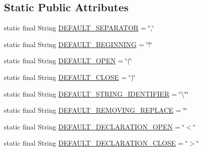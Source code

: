 \subsection*{Static Public Attributes}
\begin{DoxyCompactItemize}
\item 
static final String \hyperlink{classit_1_1emarolab_1_1cagg_1_1core_1_1language_1_1parser_1_1TextualParser_afd804f787ce5a65aec1bddbe5f258f74}{D\-E\-F\-A\-U\-L\-T\-\_\-\-S\-E\-P\-A\-R\-A\-T\-O\-R} = \char`\"{},\char`\"{}
\item 
static final String \hyperlink{classit_1_1emarolab_1_1cagg_1_1core_1_1language_1_1parser_1_1TextualParser_a82e3fa38ac4cf494023ae11e239b18e6}{D\-E\-F\-A\-U\-L\-T\-\_\-\-B\-E\-G\-I\-N\-N\-I\-N\-G} = \char`\"{}!\char`\"{}
\item 
static final String \hyperlink{classit_1_1emarolab_1_1cagg_1_1core_1_1language_1_1parser_1_1TextualParser_a4b3f1d558ca20b275641ed2a5e6b21eb}{D\-E\-F\-A\-U\-L\-T\-\_\-\-O\-P\-E\-N} = \char`\"{}(\char`\"{}
\item 
static final String \hyperlink{classit_1_1emarolab_1_1cagg_1_1core_1_1language_1_1parser_1_1TextualParser_a477638375efdcb20392b0292871c62df}{D\-E\-F\-A\-U\-L\-T\-\_\-\-C\-L\-O\-S\-E} = \char`\"{})\char`\"{}
\item 
static final String \hyperlink{classit_1_1emarolab_1_1cagg_1_1core_1_1language_1_1parser_1_1TextualParser_aec543b552ded4668a73c7b2bf5b9301d}{D\-E\-F\-A\-U\-L\-T\-\_\-\-S\-T\-R\-I\-N\-G\-\_\-\-I\-D\-E\-N\-T\-I\-F\-I\-E\-R} = \char`\"{}\textbackslash{}\char`\"{}\char`\"{}
\item 
static final String \hyperlink{classit_1_1emarolab_1_1cagg_1_1core_1_1language_1_1parser_1_1TextualParser_af6d5a2a80151c759e69c0bbbc306a3f0}{D\-E\-F\-A\-U\-L\-T\-\_\-\-R\-E\-M\-O\-V\-I\-N\-G\-\_\-\-R\-E\-P\-L\-A\-C\-E} = \char`\"{}\char`\"{}
\item 
static final String \hyperlink{classit_1_1emarolab_1_1cagg_1_1core_1_1language_1_1parser_1_1TextualParser_aa075e6ceef45f7c212a5a7074e3c3417}{D\-E\-F\-A\-U\-L\-T\-\_\-\-D\-E\-C\-L\-A\-R\-A\-T\-I\-O\-N\-\_\-\-O\-P\-E\-N} = \char`\"{}$<$\char`\"{}
\item 
static final String \hyperlink{classit_1_1emarolab_1_1cagg_1_1core_1_1language_1_1parser_1_1TextualParser_ad3397a80478c23fe4bcd487e6ffd6c0d}{D\-E\-F\-A\-U\-L\-T\-\_\-\-D\-E\-C\-L\-A\-R\-A\-T\-I\-O\-N\-\_\-\-C\-L\-O\-S\-E} = \char`\"{}$>$\char`\"{}
\end{DoxyCompactItemize}
